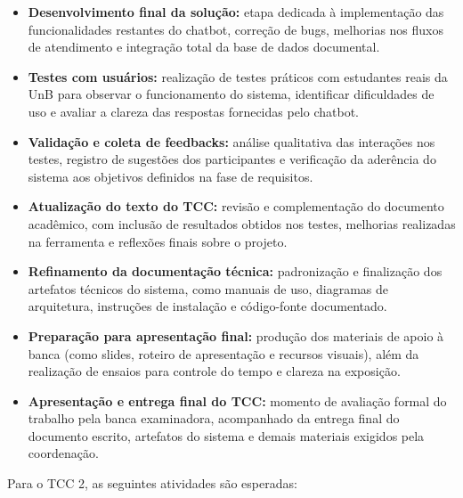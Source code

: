 \begin{itemize}
    \item \textbf{Desenvolvimento final da solução:} etapa dedicada à implementação das funcionalidades restantes do chatbot, correção de bugs, melhorias nos fluxos de atendimento e integração total da base de dados documental.

    \item \textbf{Testes com usuários:} realização de testes práticos com estudantes reais da UnB para observar o funcionamento do sistema, identificar dificuldades de uso e avaliar a clareza das respostas fornecidas pelo chatbot.

    \item \textbf{Validação e coleta de feedbacks:} análise qualitativa das interações nos testes, registro de sugestões dos participantes e verificação da aderência do sistema aos objetivos definidos na fase de requisitos.

    \item \textbf{Atualização do texto do TCC:} revisão e complementação do documento acadêmico, com inclusão de resultados obtidos nos testes, melhorias realizadas na ferramenta e reflexões finais sobre o projeto.

    \item \textbf{Refinamento da documentação técnica:} padronização e finalização dos artefatos técnicos do sistema, como manuais de uso, diagramas de arquitetura, instruções de instalação e código-fonte documentado.

    \item \textbf{Preparação para apresentação final:} produção dos materiais de apoio à banca (como slides, roteiro de apresentação e recursos visuais), além da realização de ensaios para controle do tempo e clareza na exposição.

    \item \textbf{Apresentação e entrega final do TCC:} momento de avaliação formal do trabalho pela banca examinadora, acompanhado da entrega final do documento escrito, artefatos do sistema e demais materiais exigidos pela coordenação.
\end{itemize}


Para o TCC 2, as seguintes atividades são esperadas:


